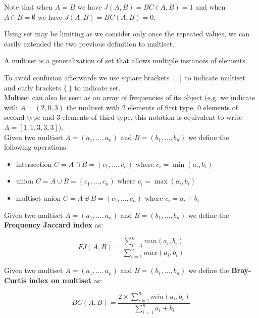 Note that when $A = B$ we have $J(A,B) = BC(A,B) = 1$ and when $A \cap B = \emptyset$ we have $J(A,B) = BC(A,B) = 0$.

Using set may be limiting as we consider only once the repeated values, we can easily extended the two previous definition to multiset.\\

\begin{definizione}
	A multiset is a generalization of set that allows multiple instances of elements.
\end{definizione}

To avoid confusion afterwards we use square brackets $[\ ]$ to indicate multiset and curly brackets $\{\ \}$ to indicate set.\\

Multiset can also be seen as an array of frequencies of its object (e.g. we indicate with $A = (2, 0, 3)$ the multiset with $2$ elements of first type, $0$ elements of second type and $3$ elements of third type, this notation is equivalent to write $A = [1, 1, 3, 3, 3]$).\\

 Given two multiset $A = (a_{1}, \ldots, a_{n}) $ and $B = (b_{1}, \ldots, b_{n})$ we define the following operations:

\begin{itemize}
  \item intersection $C = A \cap B  = (c_{1}, \ldots, c_{n})$ where $c_{i} = \min(a_{i}, b_{i})$
  \item union $C = A \cup B  = (c_{1}, \ldots, c_{n})$ where $c_{i} = \max(a_{i}, b_{i})$
  \item multiset union $C = A \uplus B  = (c_{1}, \ldots, c_{n})$ where $c_{i} = a_{i} + b_{i}$
\end{itemize}

\begin{definizione}\label{def:wjaccard}
    Given two multiset $A = (a_{1}, \ldots, a_{n}) $ and $B = (b_{1}, \ldots, b_{n})$ we define the \textbf{Frequency Jaccard index} as:
    
    \begin{equation}
    FJ(A,B) = \frac{\sum\limits_{i=1}^n { min(a_{i}, b_{i}) } }{\sum\limits_{i=1}^n { max(a_{i}, b_{i}) }}
    \end{equation}
    
\end{definizione}


\begin{definizione}\label{def:wbray}
    Given two multiset $A = (a_{1}, \ldots, a_{n}) $ and $B = (b_{1}, \ldots, b_{n})$ we define the \textbf{Bray-Curtis index on multiset} as:
    
    \begin{equation}
    BC(A,B) = \frac{ 2 \times \sum\limits_{i=1}^n { min(a_{i}, b_{i}) } }{\sum\limits_{i=1}^n {a_{i} + b_{i}}}
    \end{equation}
    
\end{definizione}

